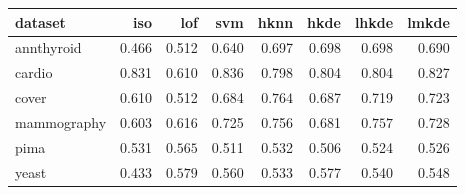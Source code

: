 \begin{tabular}{l|rrr|rrrr}
  \toprule
dataset & iso & lof & svm & hknn & hkde & lhkde & lmkde \\ 
  \midrule
annthyroid    & 0.466 & 0.512 & 0.640 & 0.697 & $\bm{0.698}$ & $\bm{0.698}$ & 0.690 \\ 
  cardio      & 0.831 & 0.610 & $\bm{0.836}$ & 0.798 & 0.804 & 0.804 & 0.827 \\ 
  cover       & 0.610 & 0.512 & 0.684 & $\bm{0.764}$ & 0.687 & 0.719 & 0.723 \\ 
  mammography & 0.603 & 0.616 & 0.725 & 0.756 & 0.681 & $\bm{0.757}$ & 0.728 \\ 
  pima        & 0.531 & $\bm{0.565}$ & 0.511 & 0.532 & 0.506 & 0.524 & 0.526 \\ 
  yeast       & 0.433 & $\bm{0.579}$ & 0.560 & 0.533 & 0.577 & 0.540 & 0.548 \\ 
   \bottomrule
\end{tabular}
